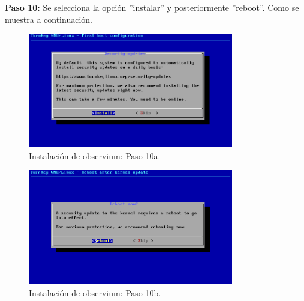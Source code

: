 \pagebreak
\noindent
\textbf{Paso 10:} Se selecciona la opción ''instalar'' y posteriormente ''reboot''. Como se muestra a continuación.

\begin{figure}[htbp!]
	\centering
		\includegraphics[width=0.8\textwidth]{images/desarrollo/instalarObservium_paso10a.png}
	\caption{Instalación de observium: Paso 10a.}
\end{figure}

\begin{figure}[htbp!]
	\centering
		\includegraphics[width=0.8\textwidth]{images/desarrollo/instalarObservium_paso10b.png}
	\caption{Instalación de observium: Paso 10b.}
\end{figure}
